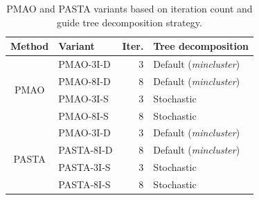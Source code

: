 \documentclass[a4paper,fleqn, review]{cas-dc}
\begin{document}
\begin{table}[!htbp]
	\small
  \centering
  \caption{PMAO and PASTA variants based on iteration count and guide tree decomposition strategy.}
    \begin{tabular}{c|l|r|l}
    \multicolumn{1}{l|}{Method} & Variant & \multicolumn{1}{l|}{Iter.} & Tree decomposition\\
    \hline
    \multirow{4}{*}{PMAO} & PMAO-3I-D  & 3     & Default (\textit{mincluster}) \\
\cline{2-4}          & 	PMAO-8I-D  & 8     & Default (\textit{mincluster}) \\
\cline{2-4}          & PMAO-3I-S  & 3     & Stochastic \\
\cline{2-4}          & PMAO-8I-S  & 8     & Stochastic\\
\hline \hline
    \multirow{4}{*}{PASTA} & PMAO-3I-D  & 3     & Default (\textit{mincluster}) \\
\cline{2-4}          & PASTA-8I-D  & 8     & Default (\textit{mincluster}) \\
\cline{2-4}          & PASTA-3I-S  & 3     & Stochastic \\
\cline{2-4}          & PASTA-8I-S  & 8     & Stochastic\\
    \end{tabular}\label{tab:variants}\end{table}
\end{document}
